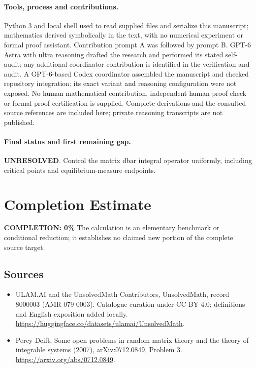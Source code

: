 \documentclass[11pt]{article}
\begin{document}
\paragraph{Tools, process and contributions.}
Python 3 and local shell used to read supplied files and serialize this manuscript; mathematics derived symbolically in the text, with no numerical experiment or formal proof assistant. Contribution prompt A was followed by prompt B. GPT-6 Astra with ultra reasoning drafted the research and performed its stated self-audit; any additional coordinator contribution is identified in the verification and audit. A GPT-6-based Codex coordinator assembled the manuscript and checked repository integration; its exact variant and reasoning configuration were not exposed. No human mathematical contribution, independent human proof check or formal proof certification is supplied. Complete derivations and the consulted source references are included here; private reasoning transcripts are not published.

\paragraph{Final status and first remaining gap.}
\textbf{UNRESOLVED}. Control the matrix dbar integral operator uniformly, including critical points and equilibrium-measure endpoints.

\section{Completion Estimate}
\noindent\textbf{COMPLETION: 0\%}
The calculation is an elementary benchmark or conditional reduction; it establishes no claimed new portion of the complete source target.

\subsection{Sources}
\begin{itemize}
\item[\hypertarget{source:8000003:1}{S1}] ULAM.AI and the UnsolvedMath Contributors, UnsolvedMath, record 8000003 (AMR-079-0003). Catalogue curation under CC BY 4.0; definitions and English exposition added locally.
\url{https://huggingface.co/datasets/ulamai/UnsolvedMath}.
\item[\hypertarget{source:8000003:2}{S2}] Percy Deift, Some open problems in random matrix theory and the theory of integrable systems (2007), arXiv:0712.0849, Problem 3.
\url{https://arxiv.org/abs/0712.0849}.
\end{itemize}
\label{end:8000003}
\end{document}
